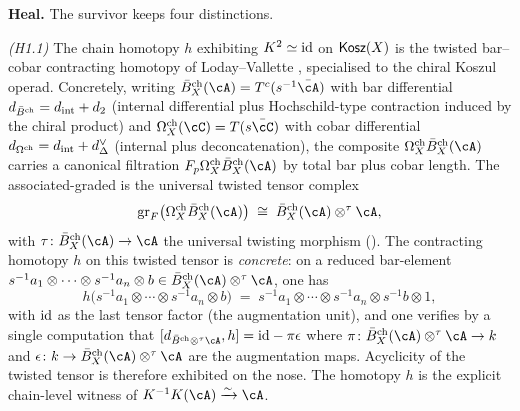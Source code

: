 \medskip
\textbf{Heal.} The survivor keeps four distinctions.

\emph{(H1.1)} The chain homotopy $h$ exhibiting $K^{2}\simeq\mathrm{id}$ on
$\mathsf{Kosz}(X)$ is the twisted bar--cobar contracting homotopy of
Loday--Vallette \cite[\S2.3--\S2.4, eq.\ (2.17)]{LV12}, specialised to
the chiral Koszul operad.
Concretely, writing $\Bbarch_X(\cA) = T^{c}(s^{-1}\bar\cA)$ with bar
differential $d_{\bar{B}^{\mathrm{ch}}} = d_{\mathrm{int}}+d_{2}$ (internal
differential plus Hochschild-type contraction induced by the chiral
product) and $\Omegach_X(\cC) = T(s\bar\cC)$ with cobar differential
$d_{\Omega^{\mathrm{ch}}} = d_{\mathrm{int}}+d^{\vee}_{\Delta}$ (internal plus
deconcatenation), the composite $\Omegach_X\Bbarch_X(\cA)$ carries a
canonical filtration $F_{p}\Omegach_X\Bbarch_X(\cA)$ by total bar plus
cobar length. The associated-graded is the universal twisted tensor
complex
\[
\mathrm{gr}_{F}\bigl(\Omegach_X\Bbarch_X(\cA)\bigr)
\;\cong\;
\Bbarch_X(\cA)\otimes^{\tau}\cA,
\]
with $\tau\colon\Bbarch_X(\cA)\to\cA$ the universal twisting morphism
(\cite[Prop.\ 2.1.8]{LV12}). The contracting homotopy $h$ on this
twisted tensor is \emph{concrete}: on a reduced bar-element
$s^{-1}a_{1}\otimes\cdots\otimes s^{-1}a_{n}\otimes b\in
\Bbarch_X(\cA)\otimes^{\tau}\cA$, one has
\[
h\bigl(s^{-1}a_{1}\otimes\cdots\otimes s^{-1}a_{n}\otimes b\bigr)
\;=\;
s^{-1}a_{1}\otimes\cdots\otimes s^{-1}a_{n}\otimes s^{-1}b\otimes 1,
\]
with $\mathrm{id}$ as the last tensor factor (the augmentation unit), and
one verifies by a single computation that
$[d_{\Bbarch\otimes^{\tau}\cA},h] = \id - \pi\epsilon$ where
$\pi\colon \Bbarch_X(\cA)\otimes^{\tau}\cA\to k$ and
$\epsilon\colon k\to\Bbarch_X(\cA)\otimes^{\tau}\cA$ are the
augmentation maps. Acyclicity of the twisted tensor is therefore
exhibited on the nose. The homotopy $h$ is the explicit chain-level
witness of $K^{-1}K(\cA)\xrightarrow{\sim}\cA$.

